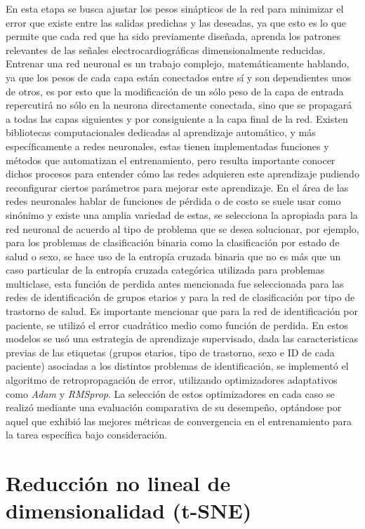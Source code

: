 \documentclass[12pt,letterpaper,oneside,openright]{book}
\begin{document}
En esta etapa se busca ajustar los pesos sinápticos de la red para minimizar el error que existe entre las salidas predichas y las deseadas, ya que esto es lo que permite que cada red que ha sido previamente diseñada, aprenda los patrones relevantes de las señales electrocardiográficas dimensionalmente reducidas. Entrenar una red neuronal es un trabajo complejo, matemáticamente hablando, ya que los pesos de cada capa están conectados entre sí y son dependientes unos de otros, es por esto que la modificación de un sólo peso de la capa de entrada repercutirá no sólo en la neurona directamente conectada, sino que se propagará a todas las capas siguientes y por consiguiente a la capa final de la red. Existen bibliotecas computacionales dedicadas al aprendizaje automático, y más específicamente a redes neuronales, estas tienen implementadas funciones y métodos que automatizan el entrenamiento, pero resulta importante conocer dichos procesos para entender cómo las redes adquieren este aprendizaje pudiendo reconfigurar ciertos parámetros para mejorar este aprendizaje. En el área de las redes neuronales hablar de funciones de pérdida o de costo se suele usar como sinónimo y existe una amplia variedad de estas, se selecciona la apropiada para la red neuronal de acuerdo al tipo de problema que se desea solucionar, por ejemplo, para los problemas de clasificación binaria como la clasificación por estado de salud o sexo, se hace uso de la entropía cruzada binaria que no es más que un caso particular de la entropía cruzada categórica utilizada para problemas multiclase, esta función de perdida antes mencionada fue seleccionada para las redes de identificación de grupos etarios y para la red de clasificación por tipo de trastorno de salud. Es importante mencionar que para la red de identificación por paciente, se utilizó el error cuadrático medio como función de perdida. En estos modelos se usó una estrategia de aprendizaje supervisado, dada las caracteristicas previas de las etiquetas (grupos etarios, tipo de trastorno, sexo e ID de cada paciente) asociadas a los distintos problemas de identificación, se implementó el algoritmo de retropropagación de error, utilizando optimizadores adaptativos como \textit{Adam} y \textit{RMSprop}. La selección de estos optimizadores en cada caso se realizó mediante una evaluación comparativa de su desempeño, optándose por aquel que exhibió las mejores métricas de convergencia en el entrenamiento para la tarea específica bajo consideración. 


\section{Reducción no lineal de dimensionalidad (t-SNE)}
\end{document}
